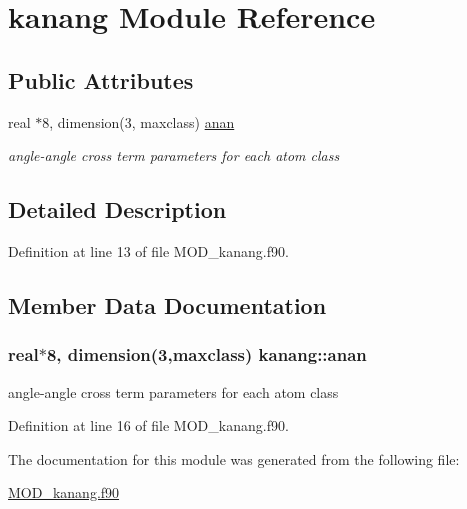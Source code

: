 \hypertarget{classkanang}{\section{kanang Module Reference}
\label{classkanang}
}
\subsection*{Public Attributes}
\begin{DoxyCompactItemize}
\item 
real $\ast$8, dimension(3, maxclass) \hyperlink{classkanang_a720d5f25ba741d1660be9f7ab067a83d}{anan}
\begin{DoxyCompactList}\small\item\em angle-\/angle cross term parameters for each atom class \end{DoxyCompactList}\end{DoxyCompactItemize}


\subsection{Detailed Description}


Definition at line 13 of file M\-O\-D\-\_\-kanang.\-f90.



\subsection{Member Data Documentation}
\hypertarget{classkanang_a720d5f25ba741d1660be9f7ab067a83d}{
\subsubsection[{anan}]{\setlength{\rightskip}{0pt plus 5cm}real$\ast$8, dimension(3,maxclass) kanang\-::anan}}\label{classkanang_a720d5f25ba741d1660be9f7ab067a83d}


angle-\/angle cross term parameters for each atom class 



Definition at line 16 of file M\-O\-D\-\_\-kanang.\-f90.



The documentation for this module was generated from the following file\-:\begin{DoxyCompactItemize}
\item 
\hyperlink{MOD__kanang_8f90}{M\-O\-D\-\_\-kanang.\-f90}\end{DoxyCompactItemize}

